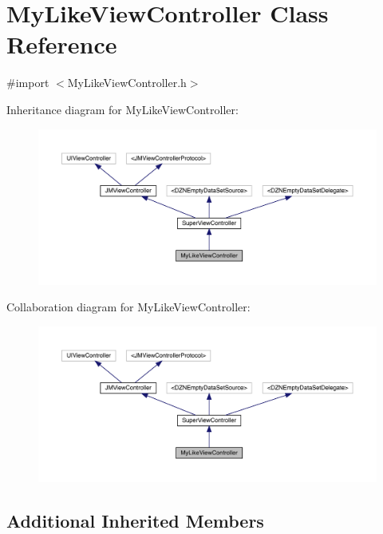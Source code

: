 \hypertarget{interface_my_like_view_controller}{}\section{My\+Like\+View\+Controller Class Reference}
\label{interface_my_like_view_controller}


{\ttfamily \#import $<$My\+Like\+View\+Controller.\+h$>$}



Inheritance diagram for My\+Like\+View\+Controller\+:\nopagebreak
\begin{figure}[H]
\begin{center}
\leavevmode
\includegraphics[width=350pt]{interface_my_like_view_controller__inherit__graph}
\end{center}
\end{figure}


Collaboration diagram for My\+Like\+View\+Controller\+:\nopagebreak
\begin{figure}[H]
\begin{center}
\leavevmode
\includegraphics[width=350pt]{interface_my_like_view_controller__coll__graph}
\end{center}
\end{figure}
\subsection*{Additional Inherited Members}



